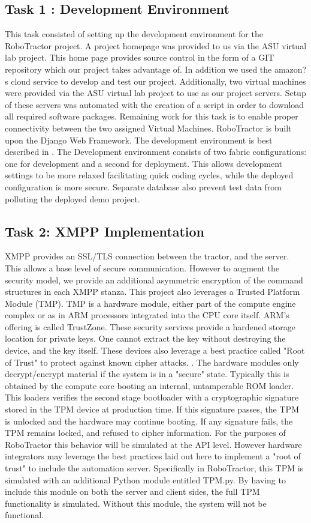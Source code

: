 \documentclass[conference,12pt]{IEEEtran}
\begin{document}
\subsection{Task 1 : Development Environment}
This task consisted of setting up the development environment for the RoboTractor project. A project homepage was provided to us via the ASU virtual lab project. This home page provides source control in the form of a GIT repository which our project takes advantage of. In addition we used the amazon?s cloud service to develop and test our project. Additionally, two virtual machines were provided via the ASU virtual lab project to use as our project servers. Setup of these servers was automated with the creation of a script in order to download all required software packages. Remaining work for this task is to enable proper connectivity between the two assigned Virtual Machines.
RoboTractor is built upon the Django Web Framework. The development environment is best
described in \autocite{_django_2014}. The Development environment consists of
two fabric configurations: one for development and a second for deployment. This
allows development settings to be more relaxed facilitating quick coding
cycles, while the deployed configuration is more secure. Separate database
also prevent test data from polluting the deployed demo project.

\subsection{Task 2: XMPP Implementation}
\label{sec:xmpp}
XMPP provides an SSL/TLS connection between the tractor, and the server. This
allows a base level of secure communication.  However to augment the security
model, we provide an additional asymmetric encryption of the command structures
in each XMPP stanza. This project also leverages a Trusted Platform
Module (TMP). TMP is a hardware module, either part of the compute engine
complex or as in ARM processors integrated into the CPU core itself.  ARM's
offering is called TrustZone.  These security services provide a hardened
storage location for private keys.  One cannot extract the key without
destroying the device, and the key itself.  These devices also leverage a best
practice called "Root of Trust" to protect against known cipher attacks.
\autocite{_tpm_2013}.  The hardware modules only decrypt/encrypt material if the system is in a "secure" state.  Typically this is obtained by the compute core booting an internal,
untamperable ROM loader.  This loaders verifies the second stage bootloader with
a cryptographic signature stored in the TPM device at production time. If this
signature passes, the TPM is unlocked and the hardware may continue booting. If
any signature fails, the TPM remains locked, and refused to cipher information.
For the purposes of RoboTractor this behavior will be simulated at the API
level.  However hardware integrators may leverage the best practices laid out
here to implement a "root of trust" to include the automation server. Specifically in RoboTractor, this TPM is simulated with an additional Python module entitled TPM.py. By having to include this module on both the server and client sides, the full TPM functionality is simulated. Without this module, the system will not be functional.
\end{document}

